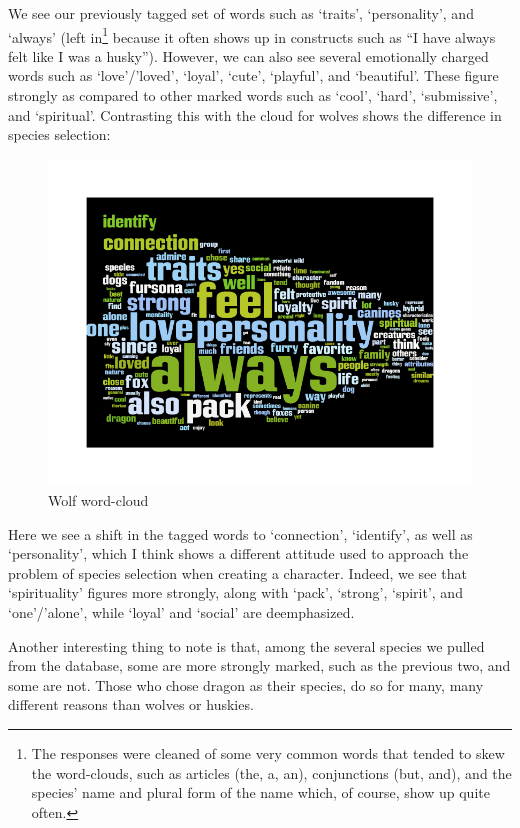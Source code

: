 We see our previously tagged set of words such as `traits', `personality', and `always' (left in\footnote{The responses were cleaned of some very common words that tended to skew the word-clouds, such as articles (the, a, an), conjunctions (but, and), and the species' name and plural form of the name which, of course, show up quite often.} because it often shows up in constructs such as ``I have always felt like I was a husky''). However, we can also see several emotionally charged words such as `love'/'loved', `loyal', `cute', `playful', and `beautiful'. These figure strongly as compared to other marked words such as `cool', `hard', `submissive', and `spiritual'. Contrasting this with the cloud for wolves shows the difference in species selection:

\begin{figure}
  \begin{center}
    \includegraphics[width=\textwidth]{content/assets/species--wolf}
  \end{center}
  \caption{Wolf word-cloud}
\end{figure}

Here we see a shift in the tagged words to `connection', `identify', as well as `personality', which I think shows a different attitude used to approach the problem of species selection when creating a character. Indeed, we see that `spirituality' figures more strongly, along with `pack', `strong', `spirit', and `one'/'alone', while `loyal' and `social' are deemphasized.

Another interesting thing to note is that, among the several species we pulled from the database, some are more strongly marked, such as the previous two, and some are not. Those who chose dragon as their species, do so for many, many different reasons than wolves or huskies.

